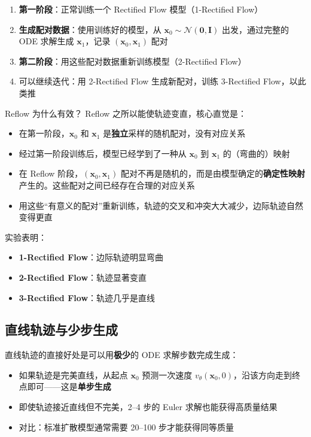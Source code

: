 \documentclass[a4paper]{article}
\begin{document}
\begin{enumerate}
    \item \textbf{第一阶段}：正常训练一个 Rectified Flow 模型（1-Rectified Flow）
    \item \textbf{生成配对数据}：使用训练好的模型，从 $\mathbf{x}_0 \sim \mathcal{N}(\mathbf{0}, \mathbf{I})$ 出发，通过完整的 ODE 求解生成 $\mathbf{x}_1$，记录 $(\mathbf{x}_0, \mathbf{x}_1)$ 配对
    \item \textbf{第二阶段}：用这些配对数据重新训练模型（2-Rectified Flow）
    \item 可以继续迭代：用 2-Rectified Flow 生成新配对，训练 3-Rectified Flow，以此类推
\end{enumerate}

\begin{importantbox}{Reflow 为什么有效？}
Reflow 之所以能使轨迹变直，核心直觉是：
\begin{itemize}
    \item 在第一阶段，$\mathbf{x}_0$ 和 $\mathbf{x}_1$ 是\textbf{独立}采样的随机配对，没有对应关系
    \item 经过第一阶段训练后，模型已经学到了一种从 $\mathbf{x}_0$ 到 $\mathbf{x}_1$ 的（弯曲的）映射
    \item 在 Reflow 阶段，$(\mathbf{x}_0, \mathbf{x}_1)$ 配对不再是随机的，而是由模型确定的\textbf{确定性映射}产生的。这些配对之间已经存在合理的对应关系
    \item 用这些``有意义的配对''重新训练，轨迹的交叉和冲突大大减少，边际轨迹自然变得更直
\end{itemize}
\end{importantbox}

实验表明：
\begin{itemize}
    \item \textbf{1-Rectified Flow}：边际轨迹明显弯曲
    \item \textbf{2-Rectified Flow}：轨迹显著变直
    \item \textbf{3-Rectified Flow}：轨迹几乎是直线
\end{itemize}

\subsection{直线轨迹与少步生成}

直线轨迹的直接好处是可以用\textbf{极少}的 ODE 求解步数完成生成：

\begin{itemize}
    \item 如果轨迹是完美直线，从起点 $\mathbf{x}_0$ 预测一次速度 $v_\theta(\mathbf{x}_0, 0)$，沿该方向走到终点即可——这是\textbf{单步生成}
    \item 即使轨迹接近直线但不完美，2--4 步的 Euler 求解也能获得高质量结果
    \item 对比：标准扩散模型通常需要 20--100 步才能获得同等质量
\end{itemize}
\end{document}
